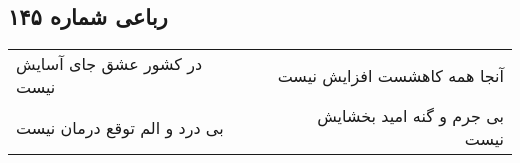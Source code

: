 \begin{center}
\section*{رباعی شماره ۱۴۵}
\label{sec:sh145}
\begin{longtable}{l p{0.5cm} r}
در کشور عشق جای آسایش نیست
&&
آنجا همه کاهشست افزایش نیست
\\
بی درد و الم توقع درمان نیست
&&
بی جرم و گنه امید بخشایش نیست
\\
\end{longtable}
\end{center}
